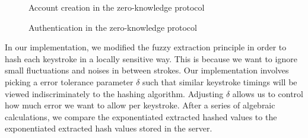 \documentclass[11pt]{article}
\begin{document}
\begin{figure}
\centering
{}
\caption{Account creation in the zero-knowledge protocol}
\label{fig:zk_new}
\end{figure}

\begin{figure}
\centering
{}
\caption{Authentication in the zero-knowledge protocol}
\label{fig:zk_auth}
\end{figure}

\newpage
In our implementation, we modified the fuzzy extraction principle in order to hash each keystroke in a locally sensitive way. This is because we want to ignore small fluctuations and noises in between strokes.  Our implementation involves picking a error tolerance parameter $\delta$ such that similar keystroke timings will be viewed indiscriminately to the hashing algorithm.  Adjusting $\delta$ allows us to control how much error we want to allow per keystroke. After a series of algebraic calculations, we compare the exponentiated extracted hashed values to the exponentiated extracted hash values stored in the server.
\end{document}
